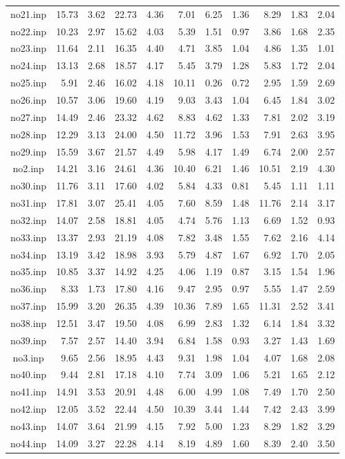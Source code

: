 {\begin{longtable}{@{}cr@{\hspace{1em}}r@{\hspace{1em}}r@{\hspace{1em}}r@{\hspace{1em}}r@{\hspace{2em}}r@{\hspace{1em}}r@{\hspace{1em}}r@{\hspace{1em}}r@{\hspace{1em}}r@{}}
no21.inp&15.73&3.62&22.73&4.36&7.01&6.25&1.36&8.29&1.83&2.04\\
no22.inp&10.23&2.97&15.62&4.03&5.39&1.51&0.97&3.86&1.68&2.35\\
no23.inp&11.64&2.11&16.35&4.40&4.71&3.85&1.04&4.86&1.35&1.01\\
no24.inp&13.13&2.68&18.57&4.17&5.45&3.79&1.28&5.83&1.72&2.04\\
no25.inp&5.91&2.46&16.02&4.18&10.11&0.26&0.72&2.95&1.59&2.69\\
no26.inp&10.57&3.06&19.60&4.19&9.03&3.43&1.04&6.45&1.84&3.02\\
no27.inp&14.49&2.46&23.32&4.62&8.83&4.62&1.33&7.81&2.02&3.19\\
no28.inp&12.29&3.13&24.00&4.50&11.72&3.96&1.53&7.91&2.63&3.95\\
no29.inp&15.59&3.67&21.57&4.49&5.98&4.17&1.49&6.74&2.00&2.57\\
no2.inp&14.21&3.16&24.61&4.36&10.40&6.21&1.46&10.51&2.19&4.30\\
no30.inp&11.76&3.11&17.60&4.02&5.84&4.33&0.81&5.45&1.11&1.11\\
no31.inp&17.81&3.07&25.41&4.05&7.60&8.59&1.48&11.76&2.14&3.17\\
no32.inp&14.07&2.58&18.81&4.05&4.74&5.76&1.13&6.69&1.52&0.93\\
no33.inp&13.37&2.93&21.19&4.08&7.82&3.48&1.55&7.62&2.16&4.14\\
no34.inp&13.19&3.42&18.98&3.93&5.79&4.87&1.67&6.92&1.70&2.05\\
no35.inp&10.85&3.37&14.92&4.25&4.06&1.19&0.87&3.15&1.54&1.96\\
no36.inp&8.33&1.73&17.80&4.16&9.47&2.95&0.97&5.55&1.47&2.59\\
no37.inp&15.99&3.20&26.35&4.39&10.36&7.89&1.65&11.31&2.52&3.41\\
no38.inp&12.51&3.47&19.50&4.08&6.99&2.83&1.32&6.14&1.84&3.32\\
no39.inp&7.57&2.57&14.40&3.94&6.84&1.58&0.93&3.27&1.43&1.69\\
no3.inp&9.65&2.56&18.95&4.43&9.31&1.98&1.04&4.07&1.68&2.08\\
no40.inp&9.44&2.81&17.18&4.10&7.74&3.09&1.06&5.21&1.65&2.12\\
no41.inp&14.91&3.53&20.91&4.48&6.00&4.99&1.08&7.49&1.70&2.50\\
no42.inp&12.05&3.52&22.44&4.50&10.39&3.44&1.44&7.42&2.43&3.99\\
no43.inp&14.07&3.64&21.99&4.15&7.92&5.00&1.23&8.29&1.82&3.29\\
no44.inp&14.09&3.27&22.28&4.14&8.19&4.89&1.60&8.39&2.40&3.50\\

\end{longtable}}
